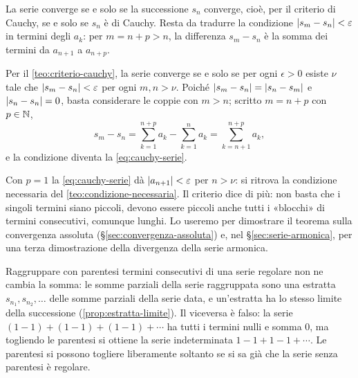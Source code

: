 \begin{schema}
\end{schema}

\begin{strategia}
La serie converge se e solo se la successione $s_{n}$ converge, cioè, per il criterio di
Cauchy, se e solo se $s_{n}$ è di Cauchy. Resta da tradurre la condizione
$\lvert s_{m}-s_{n}\rvert<\varepsilon$ in termini degli $a_{k}$: per $m=n+p>n$, la differenza $s_{m}-s_{n}$ è
la somma dei termini da $a_{n+1}$ a $a_{n+p}$.
\end{strategia}

\begin{dimostrazione}
Per il \cref{teo:criterio-cauchy}, la serie converge se e solo se per ogni $\epsilon>0$ esiste
$\nu$ tale che $\lvert s_{m}-s_{n}\rvert<\varepsilon$ per ogni $m,n>\nu$. Poiché $\lvert s_{m}-s_{n}\rvert=\lvert s_{n}-s_{m}\rvert$ e
$\lvert s_{n}-s_{n}\rvert=0$, basta considerare le coppie con $m>n$; scritto $m=n+p$ con $p\in\mathbb{N}$,
\[
  s_{m}-s_{n}=\sum_{k=1}^{n+p}a_{k}-\sum_{k=1}^{n}a_{k}=\sum_{k=n+1}^{n+p}a_{k} ,
\]
e la condizione diventa la \eqref{eq:cauchy-serie}.
\end{dimostrazione}

Con $p=1$ la \eqref{eq:cauchy-serie} dà $\lvert a_{n+1}\rvert<\varepsilon$ per $n>\nu$: si ritrova la condizione
necessaria del \cref{teo:condizione-necessaria}. Il criterio dice di più: non basta che
i singoli termini siano piccoli, devono essere piccoli anche tutti i «blocchi» di termini
consecutivi, comunque lunghi. Lo useremo per dimostrare il teorema sulla convergenza
assoluta (\S\ref{sec:convergenza-assoluta}) e, nel \S\ref{sec:serie-armonica}, per una terza
dimostrazione della divergenza della serie armonica.

\begin{osservazione}\label{oss:parentesi}
Raggruppare con parentesi termini consecutivi di una serie regolare non ne cambia la
somma: le somme parziali della serie raggruppata sono una estratta $s_{n_{1}},s_{n_{2}},\dots$
delle somme parziali della serie data, e un'estratta ha lo stesso limite della
successione (\cref{prop:estratta-limite}). Il viceversa è falso: la serie
$(1-1)+(1-1)+(1-1)+\cdots$ ha tutti i termini nulli e somma $0$, ma togliendo le parentesi si
ottiene la serie indeterminata $1-1+1-1+\cdots$. Le parentesi si possono togliere
liberamente soltanto se si sa già che la serie senza parentesi è regolare.
\end{osservazione}

